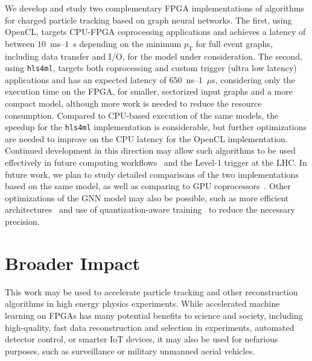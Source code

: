 \documentclass{article}
\newcommand{\hlsfml}{\texttt{hls4ml}\xspace}
\newcommand{\pt}{\ensuremath{p_{\mathrm{T}}}\xspace}
\begin{document}
We develop and study two complementary FPGA implementations of algorithms for charged particle tracking based on graph neural networks. 
The first, using OpenCL, targets CPU-FPGA coprocessing applications and achieves a latency of between $10$~ms--$1$~s depending on the minimum $\pt$ for full event graphs, including data transfer and I/O, for the model under consideration.
The second, using \hlsfml, targets both coprocessing and custom trigger (ultra low latency) applications and has an expected latency of 650~ns--1~$\mu$s, considering only the execution time on the FPGA, for smaller, sectorized input graphs and a more compact model, although more work is needed to reduce the resource consumption.
Compared to CPU-based execution of the same models, the speedup for the \hlsfml implementation is considerable, but further optimizations are needed to improve on the CPU latency for the OpenCL implementation.
Continued development in this direction may allow such algorithms to be used effectively in future computing workflows~\cite{Rankin:2020usv} and the Level-1 trigger at the LHC.
In future work, we plan to study detailed comparisons of the two implementations based on the same model, as well as comparing to GPU coprocessors~\cite{Krupa:2020bwg}.
Other optimizations of the GNN model may also be possible, such as more efficient architectures~\cite{Iiyama:2020wap} and use of quantization-aware training~\cite{DiGuglielmo:2020eqx,Coelho:2020zfu} to reduce the necessary precision.

\section*{Broader Impact}

This work may be used to accelerate particle tracking and other reconstruction algorithms in high energy physics experiments.
While accelerated machine learning on FPGAs has many potential benefits to science and society, including high-quality, fast data reconstruction and selection in experiments, automated detector control, or smarter IoT devices, it may also be used for nefarious purposes, such as surveillance or military unmanned aerial vehicles.
\end{document}
